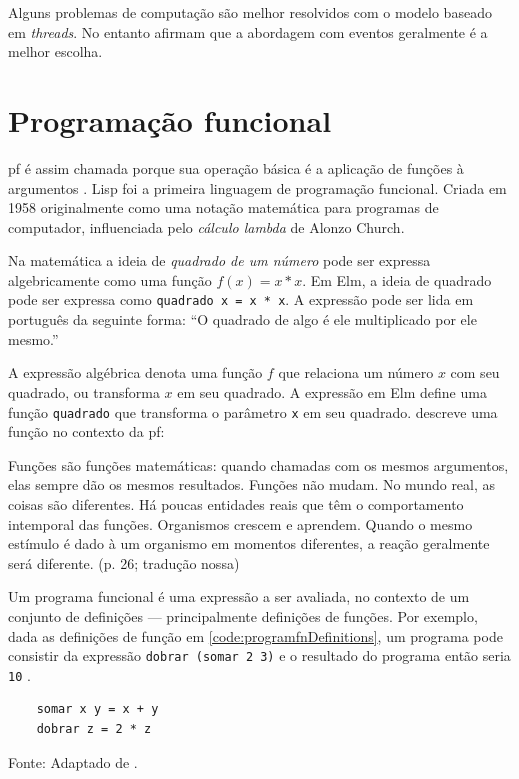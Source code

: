 Alguns problemas de computação são melhor resolvidos com o modelo baseado
em \emph{threads}. No entanto \textcite{blackheath2016} afirmam que a
abordagem com eventos geralmente é a melhor escolha.
\section{Programação funcional}
\label{sec:programacao-funcional}
\Gls{pf} é assim chamada porque sua operação básica é a
aplicação de funções à argumentos \cite{hughes1990}.
Lisp foi a primeira linguagem de programação funcional.
Criada em 1958 originalmente como uma notação matemática para programas de
computador, influenciada pelo \emph{cálculo lambda} de Alonzo Church.

Na matemática a ideia de \emph{quadrado de um número} pode ser expressa
algebricamente como uma função \(f(x)=x*x\).
Em Elm,  a ideia de quadrado pode ser
expressa como \texttt{quadrado x = x * x}.
A expressão pode ser lida em português da seguinte forma: “O quadrado de algo
é ele multiplicado por ele mesmo.”

A expressão algébrica denota uma função \(f\) que relaciona um número \(x\) com
seu quadrado, ou transforma \(x\) em seu quadrado.
A expressão em Elm define uma função \texttt{quadrado} que transforma o
parâmetro \texttt{x} em seu quadrado.
\textcite{vanroy2009} descreve uma função no contexto da \gls{pf}:

\begin{citacao}
  Funções são funções matemáticas: quando chamadas com os mesmos argumentos,
  elas sempre dão os mesmos resultados. Funções não mudam. No mundo real,
  as coisas são diferentes. Há poucas entidades reais que têm o comportamento
  intemporal das funções. Organismos crescem e aprendem. Quando o mesmo
  estímulo é dado à um organismo em momentos diferentes, a reação geralmente
  será diferente. (p. 26; tradução nossa)
\end{citacao}

Um programa funcional é uma expressão a ser avaliada, no contexto de um
conjunto de definições — principalmente definições de funções.
Por exemplo, dada as definições de função em \ref{code:programfnDefinitions}, um
programa pode consistir da expressão \texttt{dobrar (somar 2 3)} e o resultado
do programa então seria \texttt{10} \cite{noble1994}.

\begin{listing}[H]
  \centering
  \caption{Definição das funções \texttt{somar} e \texttt{dobrar}.}
  \begin{verbatim}
    somar x y = x + y
    dobrar z = 2 * z
  \end{verbatim}
  \small Fonte: Adaptado de \textcite{noble1994}.
  \label{code:programfnDefinitions}
\end{listing}

